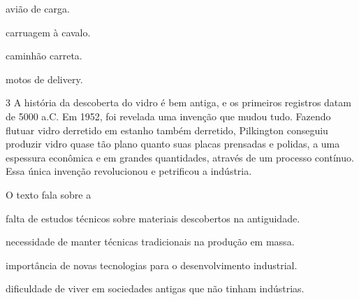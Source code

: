 \begin{escolha}
\item avião de carga.

\item carruagem à cavalo.

\item caminhão carreta.

\item motos de delivery.
\end{escolha}


\num{3} A história da descoberta do vidro é bem antiga, e os primeiros
registros datam de 5000 a.C. Em 1952, foi revelada uma invenção que
mudou tudo. Fazendo flutuar vidro derretido em estanho também derretido,
Pilkington conseguiu produzir vidro quase tão plano quanto suas placas
prensadas e polidas, a uma espessura econômica e em grandes quantidades,
através de um processo contínuo. Essa única invenção revolucionou e
petrificou a indústria.


O texto fala sobre a

\begin{escolha}
\item falta de estudos técnicos sobre materiais descobertos na antiguidade.

\item necessidade de manter técnicas tradicionais na produção em massa.

\item importância de novas tecnologias para o desenvolvimento industrial.

\item dificuldade de viver em sociedades antigas que não tinham indústrias.
\end{escolha}

